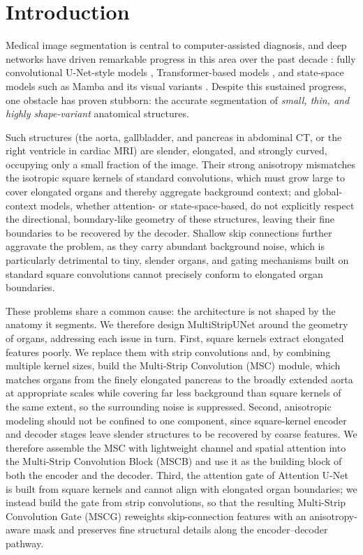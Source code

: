 \documentclass{llncs}
\begin{document}
\section{Introduction}

Medical image segmentation is central to computer-assisted diagnosis, and deep networks have driven remarkable progress in this area over the past decade \cite{he2016resnet,lecun2015deep}: fully convolutional U-Net-style models \cite{isensee2021nnu,oktay2018attention,ronneberger2015unet,zhou2018unet++}, Transformer-based models \cite{cao2021swinunet,chen2021transunet,dosovitskiy2020vit,hatamizadeh2022unetr,vaswani2017attention}, and state-space models such as Mamba and its visual variants \cite{gu2023mamba,liu2024swinumamba,liu2024vmamba,ma2024umamba,ruan2024vmunet,zhu2024vim}. Despite this sustained progress, one obstacle has proven stubborn: the accurate segmentation of \emph{small, thin, and highly shape-variant} anatomical structures.

Such structures (the aorta, gallbladder, and pancreas in abdominal CT, or the right ventricle in cardiac MRI) are slender, elongated, and strongly curved, occupying only a small fraction of the image. Their strong anisotropy mismatches the isotropic square kernels of standard convolutions, which must grow large to cover elongated organs and thereby aggregate background context; and global-context models, whether attention- or state-space-based, do not explicitly respect the directional, boundary-like geometry of these structures, leaving their fine boundaries to be recovered by the decoder. Shallow skip connections further aggravate the problem, as they carry abundant background noise, which is particularly detrimental to tiny, slender organs, and gating mechanisms built on standard square convolutions cannot precisely conform to elongated organ boundaries.

These problems share a common cause: the architecture is not shaped by the anatomy it segments. We therefore design MultiStripUNet around the geometry of organs, addressing each issue in turn. First, square kernels extract elongated features poorly. We replace them with strip convolutions and, by combining multiple kernel sizes, build the Multi-Strip Convolution (MSC) module, which matches organs from the finely elongated pancreas to the broadly extended aorta at appropriate scales while covering far less background than square kernels of the same extent, so the surrounding noise is suppressed. Second, anisotropic modeling should not be confined to one component, since square-kernel encoder and decoder stages leave slender structures to be recovered by coarse features. We therefore assemble the MSC with lightweight channel and spatial attention into the Multi-Strip Convolution Block (MSCB) and use it as the building block of both the encoder and the decoder. Third, the attention gate of Attention U-Net \cite{oktay2018attention} is built from square kernels and cannot align with elongated organ boundaries; we instead build the gate from strip convolutions, so that the resulting Multi-Strip Convolution Gate (MSCG) reweights skip-connection features with an anisotropy-aware mask and preserves fine structural details along the encoder--decoder pathway.
\end{document}
